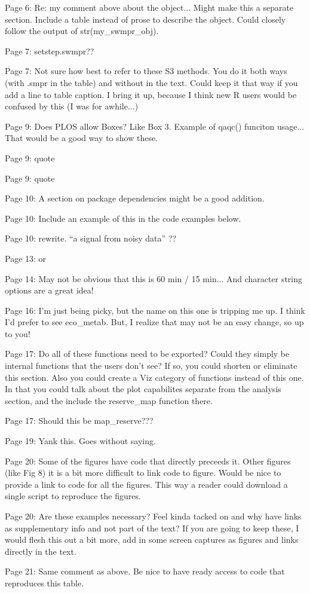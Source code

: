 \documentclass[letterpaper,12pt]{article}\usepackage[]{graphicx}\usepackage[]{color}
\begin{document}
Page 6: Re: my comment above about the object... Might make this a separate section. Include a table instead of prose to describe the object. Could closely follow the output of str(my\_swmpr\_obj).

Page 7: setstep.swmpr??

Page 7: Not sure how best to refer to these S3 methods. You do it both ways (with .smpr in the table) and without in the text. Could keep it that way if you add a line to table caption. I bring it up, because I think new R users would be confused by this (I was for awhile...)

Page 9: Does PLOS allow Boxes? Like Box 3. Example of qaqc() funciton usage... That would be a good way to show these.

Page 9: quote

Page 9: quote

Page 10: A section on package dependencies might be a good addition.

Page 10: Include an example of this in the code examples below.

Page 10: rewrite. ``a signal from noisy data'' ??

Page 13: or

Page 14: May not be obvious that this is 60 min / 15 min... And character string options are a great idea!

Page 16: I'm just being picky, but the name on this one is tripping me up. I think I'd prefer to see eco\_metab. But, I realize that may not be an easy change, so up to you!

Page 17: Do all of these functions need to be exported? Could they simply be internal functions that the users don't see? If so, you could shorten or eliminate this section. Also you could create a Viz category of functions instead of this one. In that you could talk about the plot capabilites separate from the analysis section, and the include the reserve\_map function there.

Page 17: Should this be map\_reserve???

Page 19: Yank this. Goes without saying.

Page 20: Some of the figures have code that directly preceeds it. Other figures (like Fig 8) it is a bit more difficult to link code to figure. Would be nice to provide a link to code for all the figures. This way a reader could download a single script to reproduce the figures.

Page 20: Are these examples necessary? Feel kinda tacked on and why have links as supplementary info and not part of the text? If you are going to keep these, I would flesh this out a bit more, add in some screen captures as figures and links directly in the text.

Page 21: Same comment as above. Be nice to have ready access to code that reproduces this table.
\end{document}
